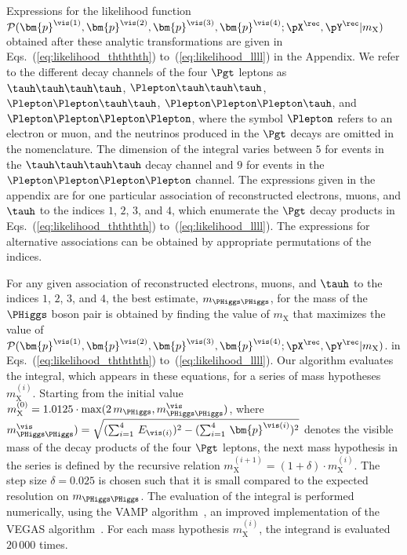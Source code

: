 Expressions for the likelihood function 
$\mathcal{P}(\bm{p}^{\vis(1)},\bm{p}^{\vis(2)},\bm{p}^{\vis(3)},\bm{p}^{\vis(4)};\pX^{\rec},\pY^{\rec}|m_{\textrm{X}})$
obtained after these analytic transformations 
are given in Eqs.~(\ref{eq:likelihood_thththth}) to~(\ref{eq:likelihood_llll}) in the Appendix.
We refer to the different decay channels of the four $\Pgt$ leptons as 
$\tauh\tauh\tauh\tauh$, $\Plepton\tauh\tauh\tauh$, $\Plepton\Plepton\tauh\tauh$, $\Plepton\Plepton\Plepton\tauh$, and $\Plepton\Plepton\Plepton\Plepton$, 
where the symbol $\Plepton$ refers to an electron or muon,
and the neutrinos produced in the $\Pgt$ decays are omitted in the nomenclature.
The dimension of the integral varies between $5$ for events in the $\tauh\tauh\tauh\tauh$ decay channel and $9$ for events in the $\Plepton\Plepton\Plepton\Plepton$ channel.
The expressions given in the appendix are for one particular association of reconstructed electrons, muons, and $\tauh$ 
to the indices $1$, $2$, $3$, and $4$, which enumerate the $\Pgt$ decay products in Eqs.~(\ref{eq:likelihood_thththth}) to~(\ref{eq:likelihood_llll}).
The expressions for alternative associations can be obtained by appropriate permutations of the indices.

For any given association of reconstructed electrons, muons, and $\tauh$ to the indices $1$, $2$, $3$, and $4$, 
the best estimate, $m_{\PHiggs\PHiggs}$, for the mass of the $\PHiggs$ boson pair is obtained 
by finding the value of $m_{\textrm{X}}$ that maximizes the value of 
$\mathcal{P}(\bm{p}^{\vis(1)},\bm{p}^{\vis(2)},\bm{p}^{\vis(3)},\bm{p}^{\vis(4)};\pX^{\rec},\pY^{\rec}|m_{\textrm{X}})$.
in Eqs.~(\ref{eq:likelihood_thththth}) to~(\ref{eq:likelihood_llll}).
Our algorithm evaluates the integral, which appears in these equations, for a series of mass hypotheses $m_{\textrm{X}}^{(i)}$.
Starting from the initial value $m_{\textrm{X}}^{(0)} = 1.0125 \cdot \max (2 \, m_{\PHiggs}, m_{\PHiggs\PHiggs}^{\vis})$,
where $m_{\PHiggs\PHiggs}^{\vis}) = \sqrt{(\sum_{i=1}^{4} \, E_{\vis(i)})^{2} - (\sum_{i=1}^{4} \, \bm{p}^{\vis(i)})^{2}}$ 
denotes the visible mass of the decay products of the four $\Pgt$ leptons,
the next mass hypothesis in the series is defined by the recursive relation $m_{\textrm{X}}^{(i+1)} = (1 + \delta) \cdot m_{\textrm{X}}^{(i)}$.
The step size $\delta = 0.025$ is chosen such that it is small compared to the expected resolution on $m_{\PHiggs\PHiggs}$.
The evaluation of the integral is performed numerically, using the VAMP algorithm~\cite{VAMP},
an improved implementation of the VEGAS algorithm~\cite{VEGAS}.
For each mass hypothesis $m_{\textrm{X}}^{(i)}$, the integrand is evaluated $20\,000$ times.

